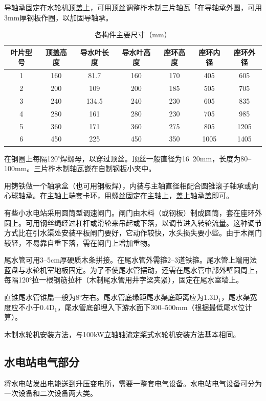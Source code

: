 \documentclass{ctexbook}
\begin{document}
导轴承固定在水轮机顶盖上，可用顶丝调整柞木制三片轴瓦「在导轴承外圆，可用3mm厚钢板作圈，以加固导轴承。
\begin{table}[htbp]
	\centering
	\caption{各构件主要尺寸（mm）}
	\begin{tabular}{c|c|c|c|c|c|c}
		\hline
		叶片型号 & 顶盖高度 & 导水叶长度 & 导水叶高度 & 座环高度  & 座环内径  & 座环外径 \\ \hline
		1     & 160   & 81.7  & 160   & 170   & 405   & 605 \\ \hline
		2     & 200   & 109   & 200   & 185   & 505   & 705 \\ \hline
		3     & 240   & 134.5 & 240   & 230   & 605   & 835 \\ \hline
		4     & 280   & 161   & 280   & 230   & 705   & 985 \\ \hline
		5     & 360   & 171   & 360   & 275   & 805   & 1205 \\ \hline
		6     & 450   & 225   & 450   & 350   & 1005  & 1405 \\ \hline
	\end{tabular}%
	\label{tab:addlabel}%
\end{table}%


在钢圈上每隔120$^\circ$焊螺母，以穿过顶丝。顶丝一般直径为16~20mm，长度为80--100mm。三片柞木制轴瓦嵌在自制钢板小夹中。

用铸铁做一个轴承盒（也可用钢板焊），内装与主轴直径相配合圆锥滚子轴承或向心球轴承。在主轴上端套卡环，用螺丝固定在主轴上，盖上轴承盖即可。

有些小水电站采用圆筒型调速闸门。闸门由木料（或钢板）制成圆筒，套在座环外圆上。可用钢丝绳经过杠杆或滑轮来吊起或下落，以调节进入转轮流量。这种调节方式比在引水渠处安装平板闸门要好，它动作较快，水头损失要小些。由于木闸门较轻，不易靠自重下落，需在闸门上增加重物。

尾水管可用3--5cm厚硬质木条拼接。在尾水管外需箍2--3道铁箍。尾水管上端用法蓝盘与水轮机室地板固定。为了不使尾水管摆动，还需在尾水管中部外壁圆周上，每隔120°拉一根钢筋拉杆（木制尾水管用井字梁夹紧），固定在尾水室墙上。

直锥尾水管锥扁一般为8°左右。尾水管底缘距尾水渠底距离应为1.3D$_1$，尾水渠宽度应不小于0.4D$_1$，尾水管底部埋入下游水面下300--500mm（根据最低尾水位计算）。

木制水轮机安装方法，与100kW立轴轴流定桨式水轮机安装方法基本相同。
\subsection{水电站电气部分}
将水电站发出电能送到升压变电所，需要一整套电气设备。水电站电气设备可分为一次设备和二次设备两大类。
\end{document}
